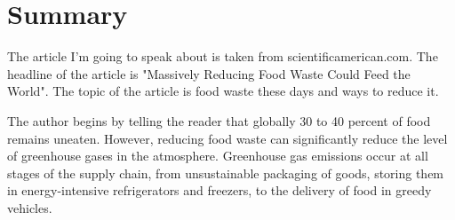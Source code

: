 \documentclass[a4paper]{article}
\begin{document}
\section*{Summary}
%
%
%

The article I’m going to speak about is taken from scientificamerican.com. The headline of the article is "Massively Reducing Food Waste Could Feed the World". The topic of the article is food waste these days and ways to reduce it.

The author begins by telling the reader that globally 30 to 40 percent of food remains uneaten. However, reducing food waste can significantly reduce the level of greenhouse gases in the atmosphere. Greenhouse gas emissions occur at all stages of the supply chain, from unsustainable packaging of goods, storing them in energy-intensive refrigerators and freezers, to the delivery of food in greedy vehicles.
\end{document}
